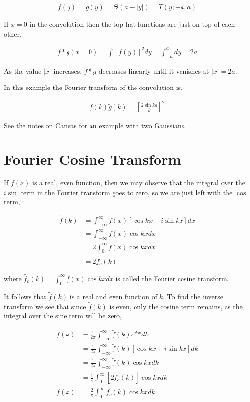 \documentclass[11pt]{amsart}
\begin{document}
\begin{align*}
  f(y) = g(y) = \Theta{(a - |y|)} = T(y; -a, a)
\end{align*}

If $x = 0$ in the convolution then the top hat functions are just on top of each other,

\begin{align*}
  f*g(x=0) = \int {[f(y)]}^2 dy = \int_{-a}^{a} dy = 2a
\end{align*}

As the value $|x|$ increases, $f * g$ decreases linearly until it vanishes at $|x| = 2a$.

In this example the Fourier transform of the convolution is,

\begin{align*}
  \tilde{f}(k) \tilde{g}(k) = {\left[\frac{2\sin{ka}}{k}\right]}^2
\end{align*}


See the notes on Canvas for an example with two Gaussians.

\section{Fourier Cosine Transform}

If $f(x)$ is a real, even function, then we may observe that the integral over the $i\sin$ term in the Fourier transform goes to zero, so we are just left with the $\cos$ term,

\begin{align*}
  \tilde{f}(k) &= \int_{-\infty}^{\infty} f(x)\left[\cos{kx}-i\sin{kx}\right]dx \\
               &= \int_{-\infty}^{\infty} f(x)\cos{kx} dx \\
               &= 2 \int_{0}^{\infty} f(x)\cos{kx} dx \\
               &= 2 \tilde{f_c}(k)
\end{align*}

where $\tilde{f_c}(k) = \int_0^{\infty}f(x)\cos{kx}dx$ is called the Fourier cosine transform.

It follows that $\tilde{f}(k)$ is a real and even function of $k$. To find the inverse transform we see that since $\tilde{f}(k)$ is even, only the cosine term remains, as the integral over the sine term will be zero,

\begin{align*}
  f(x) &= \frac{1}{2\pi}\int_{-\infty}^{\infty} \tilde{f}(k) e^{ikx} dk \\
       &= \frac{1}{2\pi}\int_{-\infty}^{\infty} \tilde{f}(k) \left[\cos{kx}+i\sin{kx}\right] dk \\
       &= \frac{1}{2\pi}\int_{-\infty}^{\infty} \tilde{f}(k) \cos{kx} dk \\
       &= \frac{1}{\pi}\int_0^{\infty} \left[2\tilde{f_c}(k)\right] \cos{kx} dk \\
  f(x) &= \frac{2}{\pi}\int_0^{\infty} \tilde{f_c}(k) \cos{kx} dk
\end{align*}
\end{document}
